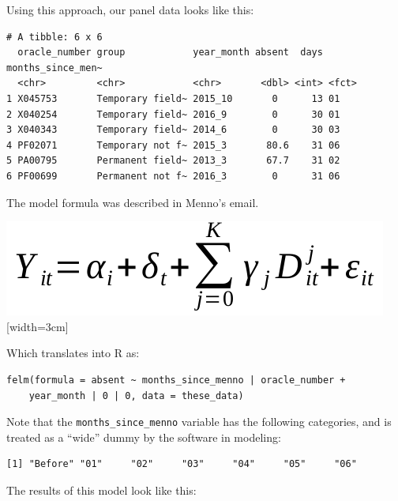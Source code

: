 \documentclass[]{article}
\begin{document}
Using this approach, our panel data looks like this:

\begin{verbatim}
# A tibble: 6 x 6
  oracle_number group            year_month absent  days months_since_men~
  <chr>         <chr>            <chr>       <dbl> <int> <fct>            
1 X045753       Temporary field~ 2015_10       0      13 01               
2 X040254       Temporary field~ 2016_9        0      30 01               
3 X040343       Temporary field~ 2014_6        0      30 03               
4 PF02071       Temporary not f~ 2015_3       80.6    31 06               
5 PA00795       Permanent field~ 2013_3       67.7    31 02               
6 PF00699       Permanent not f~ 2016_3        0      31 06               
\end{verbatim}

The model formula was described in Menno's email.

\includegraphics{images/menno}{[}width=3cm{]}

Which translates into R as:

\begin{verbatim}
felm(formula = absent ~ months_since_menno | oracle_number + 
    year_month | 0 | 0, data = these_data)
\end{verbatim}

Note that the \texttt{months\_since\_menno} variable has the following
categories, and is treated as a ``wide'' dummy by the software in
modeling:

\begin{verbatim}
[1] "Before" "01"     "02"     "03"     "04"     "05"     "06"    
\end{verbatim}

The results of this model look like this:
\end{document}
